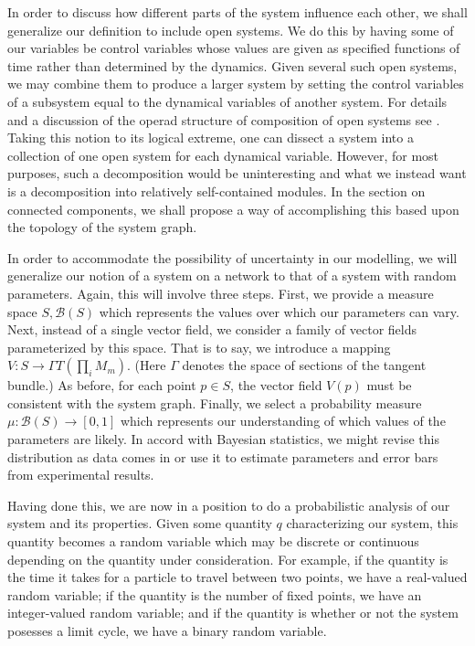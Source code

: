 In order to discuss how different parts of the system influence each
other, we shall generalize our definition to include open systems.  We
do this by having some of our variables be control variables whose
values are given as specified functions of time rather than determined
by the dynamics.  Given several such open systems, we may combine them
to produce a larger system by setting the control variables of a
subsystem equal to the dynamical variables of another system.  For
details and a discussion of the operad structure of composition of
open systems see \cite{Vagner2014}.  Taking this notion to its logical
extreme, one can dissect a system into a collection of one open system
for each dynamical variable.  However, for most purposes, such a
decomposition would be uninteresting and what we instead want is a
decomposition into relatively self-contained modules.  In the section
on connected components, we shall propose a way of accomplishing this
based upon the topology of the system graph.

In order to accommodate the possibility of uncertainty in our
modelling, we will generalize our notion of a system on a network to
that of a system with random parameters.  Again, this will involve
three steps. First, we provide a measure space $S, \mathcal{B}(S)$
which represents the values over which our parameters can vary. Next,
instead of a single vector field, we consider a family of vector
fields parameterized by this space. That is to say, we introduce a
mapping $V \colon S \to \Gamma T(\prod_i M_m)$.  (Here $\Gamma$
denotes the space of sections of the tangent bundle.)  As before, for
each point $p \in S$, the vector field $V(p)$ must be consistent with
the system graph. Finally, we select a probability measure $\mu \colon
\mathcal{B}(S) \to [0,1]$ which represents our understanding of which values of the parameters
are likely. In accord with Bayesian statistics, we might revise this
distribution as data comes in or use it to estimate parameters and error
bars from experimental results.

Having done this, we are now in a position to do a probabilistic analysis
of our system and its properties.  Given some quantity $q$ characterizing
our system, this quantity becomes a random variable which may be discrete or
continuous depending on the quantity under consideration.  For example, if
the quantity is the time it takes for a particle to travel between two points,
we have a real-valued random variable; if the quantity is the number of fixed
points, we have an integer-valued random variable; and if the quantity is
whether or not the system posesses a limit cycle, we have a binary random
variable.

